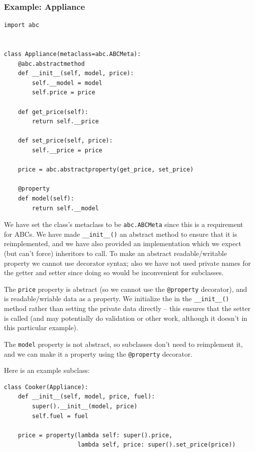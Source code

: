 \subsubsection{Example:  Appliance}

\begin{lstlisting}
import abc


class Appliance(metaclass=abc.ABCMeta):
    @abc.abstractmethod
    def __init__(self, model, price):
        self.__model = model
        self.price = price

    def get_price(self):
        return self.__price

    def set_price(self, price):
        self.__price = price

    price = abc.abstractproperty(get_price, set_price)

    @property
    def model(self):
        return self.__model  
\end{lstlisting}


We have set the class’s metaclass to be \verb|abc.ABCMeta| since this is a requirement for ABCs.
We have made \verb|__init__()| an abstract method to ensure that it is reimplemented, and we have also provided an implementation which we expect (but can’t force) inheritors to call. 
To make an abstract readable/writable property we cannot use decorator syntax; also we have not used private names for the getter and setter since doing so would be inconvenient for subclasses.


The \verb|price| property is abstract (so we cannot use the \verb|@property| decorator), and is readable/wriable data as a property.
We initialize the  in the \verb|__init__()| method rather than setting the private data directly --
this ensures that the setter is called (and may potentially do validation or other work, although it doesn’t in this particular example).



The \verb|model| property is not abstract, so subclasses don’t need to reimplement it, and we can make it a property using the \verb|@property| decorator.



Here is an example subclass:
\begin{lstlisting}
class Cooker(Appliance):
    def __init__(self, model, price, fuel):
        super().__init__(model, price)
        self.fuel = fuel

    price = property(lambda self: super().price,
                     lambda self, price: super().set_price(price))  
\end{lstlisting}


